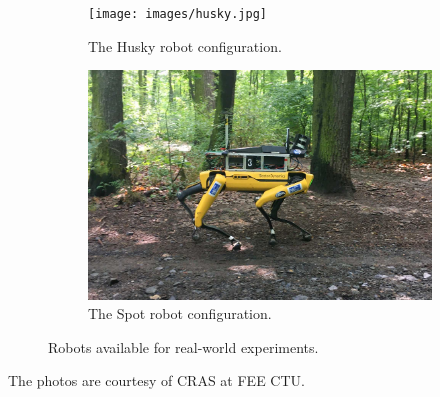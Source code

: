         \begin{figure}[H]
            \centering
            \begin{subfigure}[b]{0.495\textwidth}
                \centering
                \texttt{[image: images/husky.jpg]}
                \caption{The Husky robot configuration.}
                \label{fig:husky}
            \end{subfigure}
            \begin{subfigure}[b]{0.495\textwidth}
                \centering
                \includegraphics[width=\textwidth]{images/spot.jpg}
                \caption{The Spot robot configuration.}
                \label{fig:spot}
            \end{subfigure}
            \caption{Robots available for real-world experiments.}
        \end{figure}
        \noindent The photos are courtesy of CRAS at FEE CTU.

